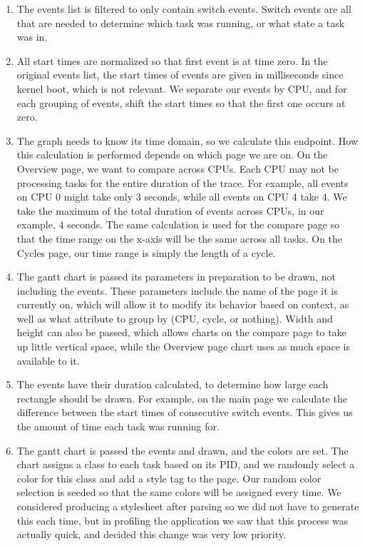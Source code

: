\documentclass{hmcclinic}
\begin{document}
  \begin{enumerate}

    \item The events list is filtered to only contain switch events. Switch
      events are all that are needed to determine which task was running, or
      what state a task was in.
  
    \item All start times are normalized so that first event is at time zero.
      In the original events list, the start times of events are given in
      milliseconds since kernel boot, which is not relevant. We separate our
      events by CPU, and for each grouping of events, shift the start times
      so that the first one occurs at zero.
  
    \item The graph needs to know its time domain, so we calculate this
      endpoint. How this calculation is performed depends on which page we are
      on. On the Overview page, we want to compare across CPUs. Each CPU may not
      be processing tasks for the entire duration of the trace. For example, all
      events on CPU 0 might take only 3 seconds, while all events on CPU 4 take
      4. We take the maximum of the total duration of events across CPUs, in our
      example, 4 seconds. The same calculation is used for the compare page so
      that the time range on the x-axis will be the same across all tasks.  On
      the Cycles page, our time range is simply the length of a cycle.
  
    \item The gantt chart is passed its parameters in preparation to be drawn,
      not including the events. These parameters include the name of the page it
      is currently on, which will allow it to modify its behavior based on
      context, as well as what attribute to group by (CPU, cycle, or nothing).
      Width and height can also be passed, which allows charts on the compare
      page to take up little vertical space, while the Overview page chart uses
      as much space is available to it.
  
   \item The events have their duration calculated, to determine how large each
     rectangle should be drawn. For example, on the main page we calculate the
     difference between the start times of consecutive switch events. This gives
     us the amount of time each task was running for.
  
   \item The gantt chart is passed the events and drawn, and the colors are set.
     The chart assigns a class to each task based on its PID, and we randomly
     select a color for this class and add a style tag to the page. Our random
     color selection is seeded so that the same colors will be assigned every
     time. We considered producing a stylesheet after parsing so we did not have
     to generate this each time, but in profiling the application we saw that
     this process was actually quick, and decided this change was very low
     priority.

  \end{enumerate}
\end{document}
